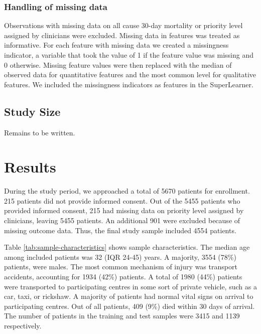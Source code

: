 \documentclass[10pt,letterpaper]{article}\usepackage[]{graphicx}\usepackage[]{color}
\begin{document}
\subsubsection*{Handling of missing data}
Observations with missing data on all cause 30-day mortality or priority level
assigned by clinicians were excluded. Missing data in features was treated as
informative. For each feature with missing data we created a missingness
indicator, a variable that took the value of 1 if the feature value was missing
and 0 otherwise. Missing feature values were then replaced with the median of
observed data for quantitative features and the most common level for
qualitative features. We included the missingness indicators as features in the
SuperLearner.

\subsection*{Study Size}
Remains to be written.

\section*{Results}
During the study period, we approached a total of 5670 patients
for enrollment. 215 patients did
not provide informed consent. Out of the 5455
patients who provided informed consent, 215 had missing data on priority level
assigned by clinicians, leaving 5455
patients. An additional 901 were excluded because of missing outcome
data. Thus, the final study sample included
4554 patients.

Table \ref{tab:sample-characteristics} shows sample characteristics. The median
age among included patients was 32 (IQR 24-45) years. A majority,
3554 (78\%) patients, were males. The most common mechanism
of injury was transport accidents, accounting for 1934 (42\%) patients. A total of 1980 (44\%) patients were transported to participating centres in some sort of
private vehicle, such as a car, taxi, or rickshaw. A majority of patients had
normal vital signs on arrival to participating centres. Out of all patients,
409 (9\%) died within 30 days of arrival. The number of
patients in the training and test samples were 3415 and
1139 respectively.
\end{document}
